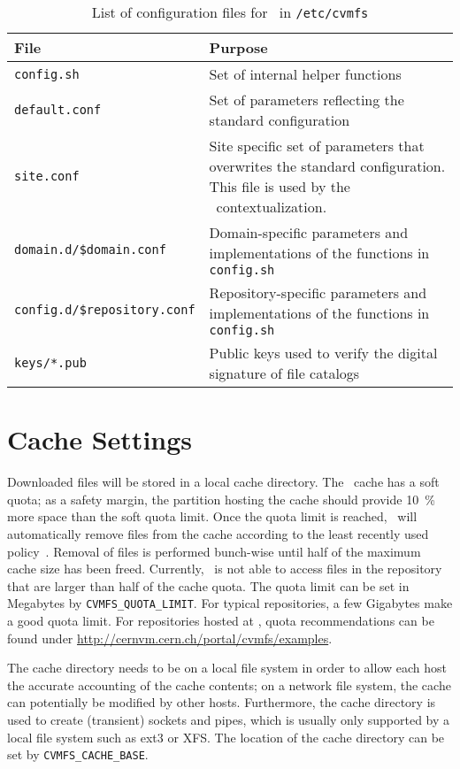 \begin{table}
	\begin{center}
		\begin{tabularx}{\linewidth}{l|X}
			{\bf\centering File} & {\bf\centering Purpose} \\\hline
			\texttt{config.sh} & Set of internal helper functions \\
			\texttt{default.conf} & Set of parameters reflecting the standard configuration \\
			\texttt{site.conf} & Site specific set of parameters that overwrites the standard configuration.  
				This file is used by the \cernvm\ contextualization. \\
			\texttt{domain.d/\$domain.conf} & Domain-specific parameters and implementations of the functions in \texttt{config.sh} \\
			\texttt{config.d/\$repository.conf} & Repository-specific parameters and implementations of the functions in \texttt{config.sh} \\
			\texttt{keys/*.pub} & Public keys used to verify the digital signature of file catalogs \\
		\end{tabularx}
	\end{center}
	\caption{List of configuration files for \cvmfs\ in \texttt{/etc/cvmfs}}
	\label{tbl:configfiles}
\end{table}


\section{Cache Settings}
\label{sct:config:cache}
Downloaded files will be stored in a local cache directory.
The \cvmfs\ cache has a soft quota; as a safety margin, the partition hosting the cache should provide \SI{10}{\percent} more space than the soft quota limit.
Once the quota limit is reached, \cvmfs\ will automatically remove files from the cache according to the least recently used policy~\cite{lru06}.
Removal of files is performed bunch-wise until half of the maximum cache size has been freed.
Currently, \cvmfs\ is not able to access files in the repository that are larger than half of the cache quota.
The quota limit can be set in Megabytes by \texttt{CVMFS\_QUOTA\_LIMIT}.
For typical repositories, a few Gigabytes make a good quota limit.
For repositories hosted at \cern, quota recommendations can be found under \url{http://cernvm.cern.ch/portal/cvmfs/examples}.

The cache directory needs to be on a local file system in order to allow each host the accurate accounting of the cache contents; on a network file system, the cache can potentially be modified by other hosts.
Furthermore, the cache directory is used to create (transient) sockets and pipes, which is usually only supported by a local file system such as ext3 or XFS.
The location of the cache directory can be set by \texttt{CVMFS\_CACHE\_BASE}.

